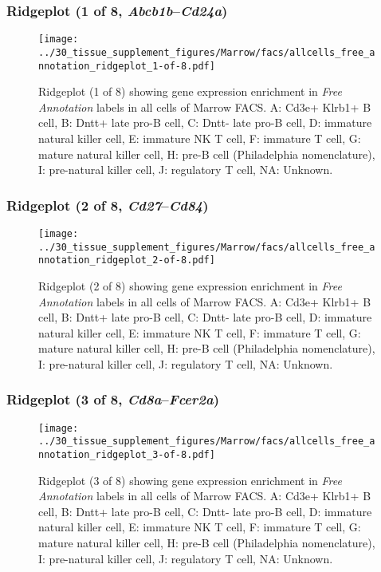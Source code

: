 \clearpage

\subsubsection{Ridgeplot (1 of 8, \emph{Abcb1b}--\emph{Cd24a})}
\begin{figure}[h]
\centering
\texttt{[image: ../30\_tissue\_supplement\_figures/Marrow/facs/allcells\_free\_annotation\_ridgeplot\_1-of-8.pdf]}

\caption{ Ridgeplot (1 of 8)  showing gene expression enrichment in \emph{Free Annotation} labels in all cells of Marrow FACS. A: Cd3e+ Klrb1+ B cell, B: Dntt+ late pro-B cell, C: Dntt- late pro-B cell, D: immature natural killer cell, E: immature NK T cell, F: immature T cell, G: mature natural killer cell, H: pre-B cell (Philadelphia nomenclature), I: pre-natural killer cell, J: regulatory T cell, NA: Unknown.}
\end{figure}


\clearpage

\subsubsection{Ridgeplot (2 of 8, \emph{Cd27}--\emph{Cd84})}
\begin{figure}[h]
\centering
\texttt{[image: ../30\_tissue\_supplement\_figures/Marrow/facs/allcells\_free\_annotation\_ridgeplot\_2-of-8.pdf]}

\caption{ Ridgeplot (2 of 8)  showing gene expression enrichment in \emph{Free Annotation} labels in all cells of Marrow FACS. A: Cd3e+ Klrb1+ B cell, B: Dntt+ late pro-B cell, C: Dntt- late pro-B cell, D: immature natural killer cell, E: immature NK T cell, F: immature T cell, G: mature natural killer cell, H: pre-B cell (Philadelphia nomenclature), I: pre-natural killer cell, J: regulatory T cell, NA: Unknown.}
\end{figure}


\clearpage

\subsubsection{Ridgeplot (3 of 8, \emph{Cd8a}--\emph{Fcer2a})}
\begin{figure}[h]
\centering
\texttt{[image: ../30\_tissue\_supplement\_figures/Marrow/facs/allcells\_free\_annotation\_ridgeplot\_3-of-8.pdf]}

\caption{ Ridgeplot (3 of 8)  showing gene expression enrichment in \emph{Free Annotation} labels in all cells of Marrow FACS. A: Cd3e+ Klrb1+ B cell, B: Dntt+ late pro-B cell, C: Dntt- late pro-B cell, D: immature natural killer cell, E: immature NK T cell, F: immature T cell, G: mature natural killer cell, H: pre-B cell (Philadelphia nomenclature), I: pre-natural killer cell, J: regulatory T cell, NA: Unknown.}
\end{figure}


